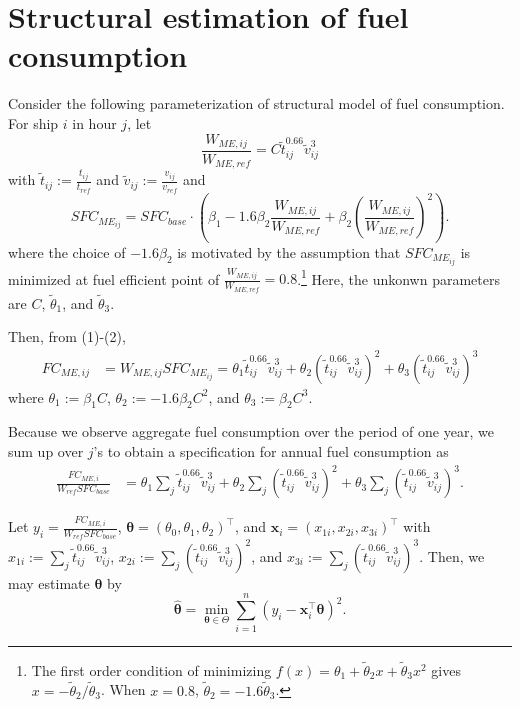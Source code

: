 \documentclass{article}
\begin{document}
\section{Structural estimation of fuel consumption}

Consider the following parameterization of structural model of fuel consumption. For ship $i$ in hour $j$, let
\begin{equation}
\frac{W_{ME,{ij}} }{W_{ME,ref} }= C\tilde t_{ij}^{0.66}\tilde v_{ij}^{3}
\end{equation}
with $\tilde t_{ij}:=\frac{t_{ij}}{t_{ref}} $ and $\tilde v_{ij}:=\frac{v_{ij}}{v_{ref}}$
and
\begin{equation}\label{eq:sfc}
SFC_{ME_{ij}} = SFC_{base} \cdot \left(\beta_1 - 1.6 \beta_2 \frac{W_{ME,ij}}{W_{ME,ref} } +  \beta_2\left( \frac{W_{ME,ij}}{W_{ME,ref}} \right)^2  \right).
\end{equation}
where the choice of $ - 1.6\beta_2$ is motivated by the assumption that $SFC_{ME_{ij}} $ is minimized at fuel efficient point of $ \frac{W_{ME,ij}}{W_{ME,ref} }=0.8$.\footnote{The first order condition of minimizing $f(x)=\theta_1 + \tilde\theta_2 x + \tilde\theta_3 x^2$ gives $x = - \tilde\theta_2/\tilde\theta_3$. When $x=0.8$, $\tilde\theta_2 = -1.6 \tilde\theta_3$.} Here, the unkonwn parameters are $C$, $\tilde\theta_1$, and $\tilde\theta_3$.

Then, from (1)-(2),
\begin{align*}
FC_{ME,ij} &= W_{ME,ij}SFC_{ME_{ij}} =    \theta_1\tilde t_{ij}^{0.66}\tilde v_{ij}^{3} + \theta_2  \left(\tilde t_{ij}^{0.66}\tilde v_{ij}^{3} \right)^2 +   \theta_3 \left( \tilde t_{ij}^{0.66}\tilde v_{ij}^{3} \right)^3 
\end{align*}
where $\theta_1 := \beta_1C$, $\theta_2:=-1.6\beta_2C^2$, and $\theta_3 := \beta_2C^3$.

Because we observe aggregate fuel consumption over the period of one year, we sum up over $j$'s to obtain a specification for annual fuel consumption as
\begin{align}\label{model-1}
\frac{FC_{ME,i} }{ W_{ref} SFC_{base}}
&=  \theta_1  \sum_{j} \tilde t_{ij}^{0.66}\tilde v_{ij}^{3}  + \theta_2  \sum_{j} \left(\tilde t_{ij}^{0.66}\tilde v_{ij}^{3}  \right)^2 +   \theta_3 \sum_{j}\left( \tilde t_{ij}^{0.66}\tilde v_{ij}^{3}  \right)^3.
\end{align}


Let $y_i = \frac{FC_{ME,i} }{ W_{ref} SFC_{base} }$,   $\boldsymbol{\theta}=(\theta_0,\theta_1,\theta_2)^\top$, and $\mathbf x_i=(x_{1i},x_{2i},x_{3i})^\top$ with $x_{1i}:= \sum_{j} \tilde t_{ij}^{0.66}\tilde v_{ij}^{3} $, $x_{2i}:= \sum_{j} \left(\tilde t_{ij}^{0.66}\tilde v_{ij}^{3} \right)^2 $, and $x_{3i}:= \sum_{j}\left( \tilde t_{ij}^{0.66}\tilde v_{ij}^{3}  \right)^3$. Then, we may estimate $\boldsymbol{\theta}$ by
\[
\hat{\boldsymbol{\theta}} = \min_{\boldsymbol{\theta}\in\Theta} \sum_{i=1}^n (y_i - \mathbf{x}_i^\top\boldsymbol{\theta})^2.
\]
\end{document}
